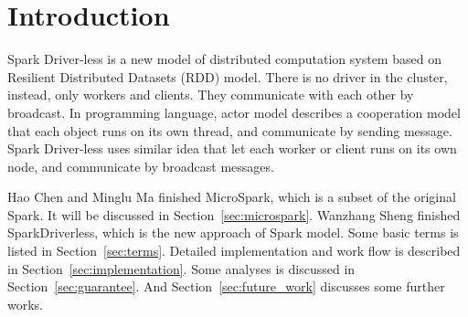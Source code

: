 
\section{Introduction} %
\label{sec:introduction}

Spark Driver-less is a new model of distributed computation system based on
Resilient Distributed Datasets (RDD)\cite{rdd} model.
There is no driver in the cluster, instead, only workers and clients.
They communicate with each other by broadcast.
In programming language, actor model describes a cooperation model that each object runs on its own thread,
and communicate by sending message.
Spark Driver-less uses similar idea that let each worker or client runs on its own node,
and communicate by broadcast messages.

Hao Chen and Minglu Ma finished MicroSpark, which is a subset of the original Spark.
It will be discussed in Section~\ref{sec:microspark}.
Wanzhang Sheng finished SparkDriverless, which is the new approach of Spark model.
Some basic terms is listed in Section~\ref{sec:terms}.
Detailed implementation and work flow is described in Section~\ref{sec:implementation}.
Some analyses is discussed in Section~\ref{sec:guarantee}.
And Section~\ref{sec:future_work} discusses some further works.

